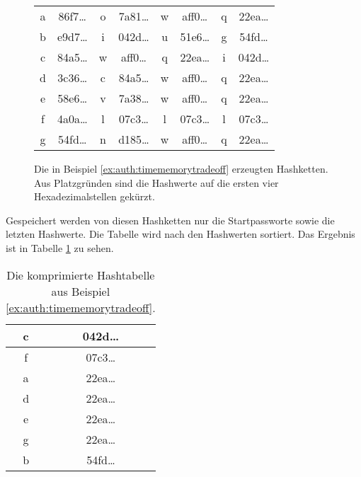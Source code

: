 \begin{beispiel}
\begin{figure}[h!]
\begin{center}
  \begin{tabular}{c@{$\;\hasharrow\;$}c@{$\;\VRTF\;$}c@{$\;\hasharrow\;$}c@{$\;\VRTF\;$}c@{$\;\hasharrow\;$}c@{$\;\VRTF\;$}c@{$\;\hasharrow\;$}c}
    a & 86f7\ldots & o & 7a81\ldots & w & aff0\ldots & q & 22ea\ldots\\
    b &e9d7\ldots & i & 042d\ldots & u & 51e6\ldots & g & 54fd\ldots\\
    c &84a5\ldots & w & aff0\ldots & q & 22ea\ldots & i & 042d\ldots\\
    d &3c36\ldots & c & 84a5\ldots & w & aff0\ldots & q & 22ea\ldots\\ 
    e &58e6\ldots & v & 7a38\ldots & w & aff0\ldots & q & 22ea\ldots\\
    f &4a0a\ldots & l & 07c3\ldots & l & 07c3\ldots & l & 07c3\ldots\\
    g &54fd\ldots & n & d185\ldots & w & aff0\ldots & q & 22ea\ldots\\
  \end{tabular}
  \caption{Die in Beispiel \ref{ex:auth:timememorytradeoff}
    erzeugten Hashketten. Aus Platzgründen sind die Hashwerte auf die ersten
    vier Hexadezimalstellen gekürzt.}
  \label{fig:auth:timememorytradeoff:hashchains}
\end{center}
\end{figure}

Gespeichert werden von diesen Hashketten nur die Startpassworte sowie
die letzten Hashwerte. Die Tabelle wird nach den Hashwerten
sortiert. Das Ergebnis ist in Tabelle
\ref{table:auth:timememorytradeoff:hashtable} zu sehen.

\begin{table}[h!]
  \begin{center}
    \begin{tabular}{|c|c|} \hline 
      c & 042d\ldots\\ \hline 
      f & 07c3\ldots\\ \hline 
      a & 22ea\ldots\\ \hline 
      d & 22ea\ldots\\ \hline 
      e & 22ea\ldots\\ \hline 
      g & 22ea\ldots\\ \hline 
      b & 54fd\ldots\\ \hline
    \end{tabular}
  \end{center}
  \caption{Die komprimierte Hashtabelle aus Beispiel
    \ref{ex:auth:timememorytradeoff}.}
  \label{table:auth:timememorytradeoff:hashtable}
\end{table}


\end{beispiel}
